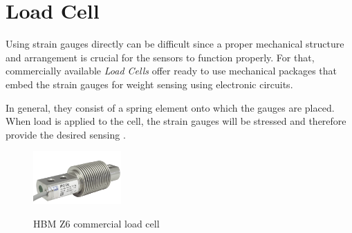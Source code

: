 \section{Load Cell}

Using strain gauges directly can be difficult since a proper
mechanical structure and arrangement is crucial for the sensors to function
properly. For that, commercially available \textit{Load Cells} offer ready to
use mechanical packages that embed the strain gauges for weight sensing
using electronic circuits.

In general, they consist of a spring element onto which the gauges are placed.
When load is applied to the cell, the strain gauges will be stressed and
therefore provide the desired sensing \cite{HBM2022}.

\begin{figure}[H]
	\centering
	\caption[HBM Z6 commercial load cell]{HBM Z6 commercial load cell}
    \includegraphics[width=0.3\textwidth]{./images/hbmz6.png}
	\label{fig:gauge2}
\end{figure}
